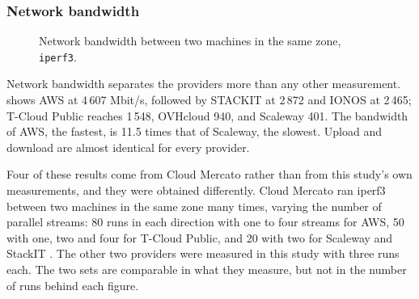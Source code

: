 \subsubsection{Network bandwidth}

\begin{figure}[htbp]
  \centering
  \caption{Network bandwidth between two machines in the same zone, \texttt{iperf3}.}
  \label{fig:bench-iperf}
\end{figure}

Network bandwidth separates the providers more than any other measurement.
 shows \acs{AWS} at 4\,607 Mbit/s, followed by STACKIT at 2\,872 and
IONOS at 2\,465; T-Cloud Public reaches 1\,548, OVHcloud 940, and Scaleway 401. The
bandwidth of \acs{AWS}, the fastest, is 11.5 times that of Scaleway, the slowest.
Upload and download are almost identical
for every provider.

Four of these results come from Cloud Mercato rather than from this study's own
measurements, and they were obtained differently. Cloud Mercato ran iperf3
between two machines in the same zone many times, varying the number of parallel
streams: 80 runs in each direction with one to four streams for \acs{AWS}, 50 with
one, two and four for T-Cloud Public, and 20 with two for Scaleway and StackIT
\cite{CloudMercato_AWS_m6i,CloudMercato_TSystems_s3,CloudMercato_Scaleway_POP2}.
The other two providers were measured in this study with three runs each. The
two sets are comparable in what they measure, but not in the number of runs
behind each figure.


